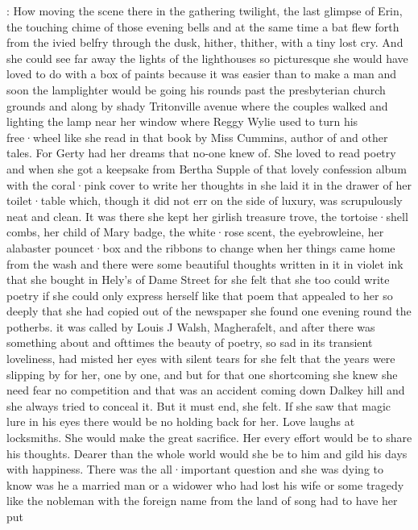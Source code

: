 :
How moving the scene there in the gathering twilight,
the last glimpse of
Erin,
the touching chime of those evening bells and at the same time a bat
flew forth from the ivied belfry through the dusk,
hither,
thither,
with a
tiny lost cry.
And she could see far away the lights of the lighthouses so
picturesque she would have loved to do with a box of paints because it was
easier than to make a man
and soon the lamplighter would be going his rounds
past the presbyterian church grounds
and along by shady
Tritonville avenue where the couples walked and lighting the lamp near her
window where Reggy Wylie used to turn his free·wheel like she read in that
book  by Miss Cummins,
author of  and
other tales.
For Gerty had her dreams that no-one knew of.
She loved to
read poetry and when she got a keepsake from Bertha Supple of that lovely
confession album with the coral·pink cover to write her thoughts in she
laid it in the drawer of her toilet·table which,
though it did not err
on the side of luxury,
was scrupulously neat and clean.
It was there
she kept her girlish treasure trove,
the tortoise·shell combs,
her
child of Mary badge,
the white·rose scent,
the eyebrowleine,
her alabaster pouncet·box
and the ribbons to change
when her things came home from the wash
and there were some beautiful thoughts written
in it in violet ink that she bought in Hely's of Dame Street for
she felt that she too could write poetry if she could only express
herself like that poem that appealed to her so deeply that she had
copied out of the newspaper she found one evening round the potherbs.
it was called by Louis J Walsh,
Magherafelt,
and
after there was something about
and ofttimes
the beauty of poetry,
so sad in its transient loveliness,
had misted
her eyes with silent tears for she felt that the years were slipping
by for her,
one by one,
and but for that one shortcoming
she knew she need fear no competition and that was an accident coming down Dalkey
hill and she always tried to conceal it.
But it must end,
she felt.
If she saw that magic lure in his eyes there would be no holding
back for her.
Love laughs at locksmiths.
She would make the great
sacrifice.
Her every effort would be to share his thoughts.
Dearer than
the whole world would she be to him and gild his days with happiness.
There was the all·important question and she was dying to know was he a
married man or a widower who had lost his wife or some tragedy like the
nobleman with the foreign name from the land of song had to have her put
